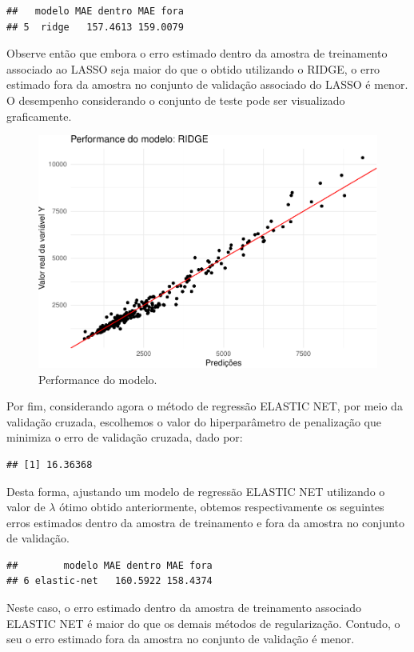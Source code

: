 \documentclass[11pt,]{article}
\begin{document}
\begin{verbatim}
##   modelo MAE dentro MAE fora
## 5  ridge   157.4613 159.0079
\end{verbatim}

Observe então que embora o erro estimado dentro da amostra de
treinamento associado ao LASSO seja maior do que o obtido utilizando o
RIDGE, o erro estimado fora da amostra no conjunto de validação
associado do LASSO é menor. O desempenho considerando o conjunto de
teste pode ser visualizado graficamente.

\begin{figure}

{\centering \includegraphics[width=0.6\linewidth]{figs/unnamed-chunk-12} 

}

\caption{Performance do modelo.}\label{fig:unnamed-chunk-12}
\end{figure}

Por fim, considerando agora o método de regressão ELASTIC NET, por meio
da validação cruzada, escolhemos o valor do hiperparâmetro de
penalização que minimiza o erro de validação cruzada, dado por:

\begin{verbatim}
## [1] 16.36368
\end{verbatim}

\noindent Desta forma, ajustando um modelo de regressão ELASTIC NET
utilizando o valor de \(\lambda\) ótimo obtido anteriormente, obtemos
respectivamente os seguintes erros estimados dentro da amostra de
treinamento e fora da amostra no conjunto de validação.

\begin{verbatim}
##        modelo MAE dentro MAE fora
## 6 elastic-net   160.5922 158.4374
\end{verbatim}

\noindent Neste caso, o erro estimado dentro da amostra de treinamento
associado ELASTIC NET é maior do que os demais métodos de regularização.
Contudo, o seu o erro estimado fora da amostra no conjunto de validação
é menor.
\end{document}
